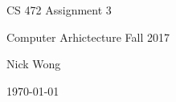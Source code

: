 \documentclass[onecolumn, draftclsnofoot,10pt, compsoc]{IEEEtran}
\begin{document}
\begin{titlepage}
    \begin{singlespace}
        \par\vspace{.2in}
        \centering
        \scshape{
            \huge CS 472 Assignment 3 \par
            \small Computer Arhictecture Fall 2017 \par
            \vspace{2cm}
            \small Nick Wong \par
            \vspace{2cm}
            {\small\today}\par
            \vspace{.5in}
            \vfill
        }
    \end{singlespace}
\end{titlepage}

\newpage
{}
\tableofcontents
\clearpage
\end{document}

